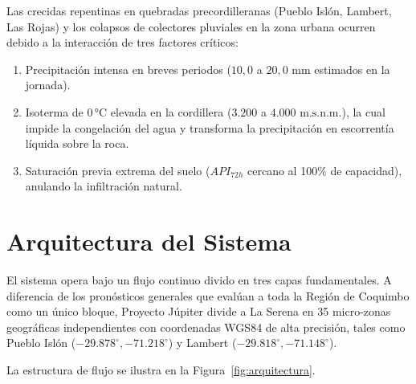 \documentclass[11pt,a4paper]{article}
\begin{document}
Las crecidas repentinas en quebradas precordilleranas (Pueblo Islón, Lambert, Las Rojas) y los colapsos de colectores pluviales en la zona urbana ocurren debido a la interacción de tres factores críticos:
\begin{enumerate}
    \item Precipitación intensa en breves periodos ($10,0$ a $20,0\text{ mm}$ estimados en la jornada).
    \item Isoterma de 0\,°C elevada en la cordillera ($3.200$ a $4.000\text{ m.s.n.m.}$), la cual impide la congelación del agua y transforma la precipitación en escorrentía líquida sobre la roca.
    \item Saturación previa extrema del suelo ($API_{72h}$ cercano al 100\% de capacidad), anulando la infiltración natural.
\end{enumerate}

\newpage

\section{Arquitectura del Sistema}

El sistema opera bajo un flujo continuo divido en tres capas fundamentales. A diferencia de los pronósticos generales que evalúan a toda la Región de Coquimbo como un único bloque, Proyecto Júpiter divide a La Serena en 35 micro-zonas geográficas independientes con coordenadas WGS84 de alta precisión, tales como Pueblo Islón ($-29.878^\circ, -71.218^\circ$) y Lambert ($-29.818^\circ, -71.148^\circ$).

La estructura de flujo se ilustra en la Figura~\ref{fig:arquitectura}.
\end{document}
